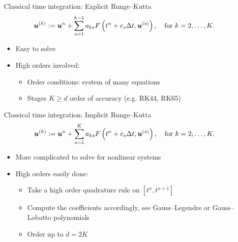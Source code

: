 \documentclass[9pt,compress,t,aspectratio=169]{beamer}
\begin{document}
\begin{frame}{Classical time integration: Explicit Runge--Kutta}
\begin{align*}
	&\boldsymbol{u}^{(k)}:=\boldsymbol{u}^n+\sum_{s=1}^{k-1} a_{ks} F\left(t^n+c_s\Delta t,\boldsymbol{u}^{(s)}\right),\quad \text{for } k=2,\dots, K.
\end{align*}

\begin{itemize}
\item Easy to solve
\item High orders involved:
\begin{itemize}
\item Order conditions: system of many equations
\item Stages  $K\geq d$ order of accuracy (e.g. RK44, RK65) 
\end{itemize}
\end{itemize} 
 
\end{frame}

\begin{frame}{Classical time integration: Implicit Runge--Kutta}
\begin{align*}
	&\boldsymbol{u}^{(k)}:=\boldsymbol{u}^n+\sum_{s=1}^{K} a_{ks} F\left(t^n+c_s\Delta t,\boldsymbol{u}^{(s)}\right), \quad \text{for } k=2,\dots, K.
\end{align*}

\begin{itemize}
\item More complicated to solve for nonlinear systems
\item High orders easily done:
\begin{itemize}
\item Take a high order quadrature rule on $[t^n,t^{n+1}]$
\item Compute the coefficients accordingly, see Gauss--Legendre or Gauss--Lobatto polynomials
\item Order up to $d=2K$ 
\end{itemize}
\end{itemize} 
 
\end{frame}
\end{document}
